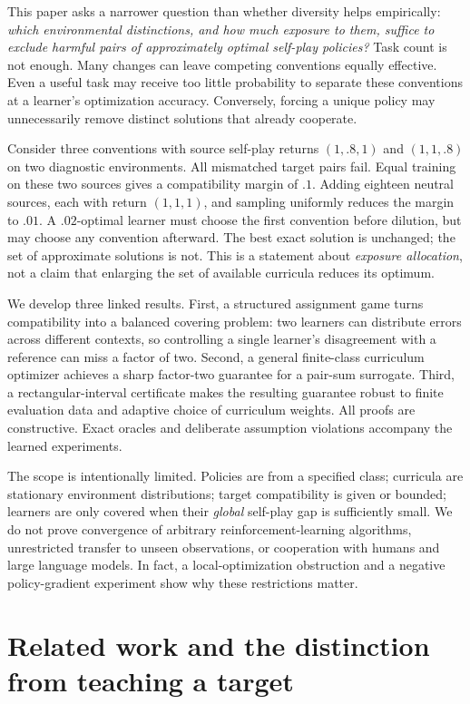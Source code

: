 \documentclass[11pt]{article}
\theoremstyle{definition}\newtheorem{definition}[theorem]{Definition}
\newcommand{\1}{\mathbf{1}}
\begin{document}
This paper asks a narrower question than whether diversity helps empirically: \emph{which environmental distinctions, and how much exposure to them, suffice to exclude harmful pairs of approximately optimal self-play policies?} Task count is not enough. Many changes can leave competing conventions equally effective. Even a useful task may receive too little probability to separate these conventions at a learner's optimization accuracy. Conversely, forcing a unique policy may unnecessarily remove distinct solutions that already cooperate.

Consider three conventions with source self-play returns $(1,.8,1)$ and $(1,1,.8)$ on two diagnostic environments. All mismatched target pairs fail. Equal training on these two sources gives a compatibility margin of $.1$. Adding eighteen neutral sources, each with return $(1,1,1)$, and sampling uniformly reduces the margin to $.01$. A $.02$-optimal learner must choose the first convention before dilution, but may choose any convention afterward. The best exact solution is unchanged; the set of approximate solutions is not. This is a statement about \emph{exposure allocation}, not a claim that enlarging the set of available curricula reduces its optimum.

We develop three linked results. First, a structured assignment game turns compatibility into a balanced covering problem: two learners can distribute errors across different contexts, so controlling a single learner's disagreement with a reference can miss a factor of two. Second, a general finite-class curriculum optimizer achieves a sharp factor-two guarantee for a pair-sum surrogate. Third, a rectangular-interval certificate makes the resulting guarantee robust to finite evaluation data and adaptive choice of curriculum weights. All proofs are constructive. Exact oracles and deliberate assumption violations accompany the learned experiments.

The scope is intentionally limited. Policies are from a specified class; curricula are stationary environment distributions; target compatibility is given or bounded; learners are only covered when their \emph{global} self-play gap is sufficiently small. We do not prove convergence of arbitrary reinforcement-learning algorithms, unrestricted transfer to unseen observations, or cooperation with humans and large language models. In fact, a local-optimization obstruction and a negative policy-gradient experiment show why these restrictions matter.

\section{Related work and the distinction from teaching a target}
\end{document}
